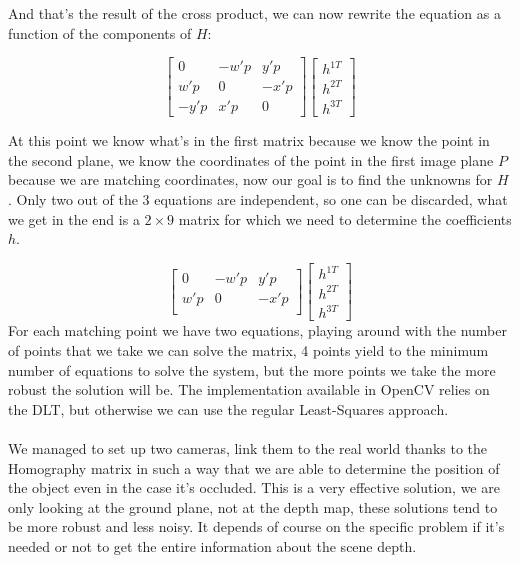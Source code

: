 And that's the result of the cross product, we can now rewrite the equation as a function of the components of \(H\):

\[
    \begin{bmatrix}
        0 & -w'p & y'p \\
        w'p & 0 & -x'p \\
        -y'p & x'p & 0
    \end{bmatrix}  
    \begin{bmatrix}
        h^{1T} \\
        h^{2T} \\
        h^{3T}
    \end{bmatrix}  
\]

At this point we know what's in the first matrix because we know the point in the second plane, we know the coordinates of the point in the first image plane \(P\) because we are matching coordinates, now our goal is to find the unknowns for \(H\).
Only two out of the 3 equations are independent, so one can be discarded, what we get in the end is a \(2\times 9\) matrix for which we need to determine the coefficients \(h\).

\[
    \begin{bmatrix}
        0 & -w'p & y'p \\
        w'p & 0 & -x'p \\
    \end{bmatrix}  
    \begin{bmatrix}
        h^{1T} \\
        h^{2T} \\
        h^{3T}
    \end{bmatrix}  
\]
For each matching point we have two equations, playing around with the number of points that we take we can solve the matrix, 4 points yield to the minimum number of equations to solve the system, but the more points we take the more robust the solution will be. The implementation available in OpenCV relies on the DLT, but otherwise we can use the regular Least-Squares approach.
\\
\\
We managed  to set up two cameras, link them to the real world thanks to the Homography matrix in such a way that we are able to determine the position of the object even in the case it's occluded. This is a very effective solution, we are only looking at the ground plane, not at the depth map, these solutions tend to be more robust and less noisy. It depends of course on the specific problem if it's needed or not to get the entire information about the scene depth.

